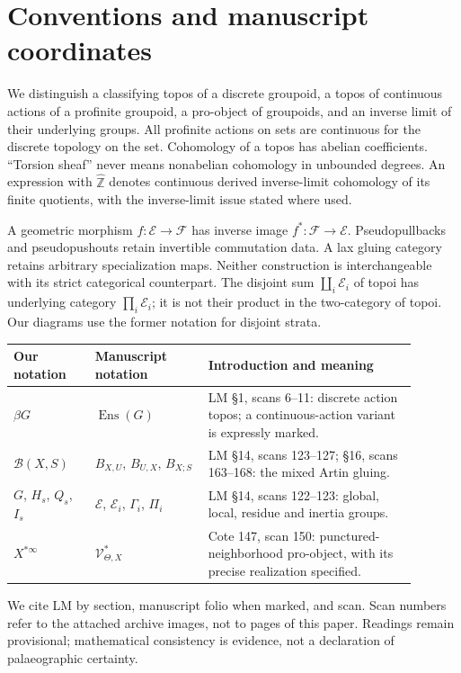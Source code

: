 \section*{Conventions and manuscript coordinates}
We distinguish a classifying topos of a discrete groupoid, a topos of continuous actions of a profinite groupoid, a pro-object of groupoids, and an inverse limit of their underlying groups. All profinite actions on sets are continuous for the discrete topology on the set. Cohomology of a topos has abelian coefficients. ``Torsion sheaf'' never means nonabelian cohomology in unbounded degrees. An expression with $\widehat{\mathbb Z}$ denotes continuous derived inverse-limit cohomology of its finite quotients, with the inverse-limit issue stated where used.

A geometric morphism $f:\mathcal E\to\mathcal F$ has inverse image $f^*:\mathcal F\to\mathcal E$. Pseudopullbacks and pseudopushouts retain invertible commutation data. A lax gluing category retains arbitrary specialization maps. Neither construction is interchangeable with its strict categorical counterpart.
The disjoint sum $\coprod_i\mathcal E_i$ of topoi has underlying category $\prod_i\mathcal E_i$; it is not their product in the two-category of topoi. Our diagrams use the former notation for disjoint strata.

\begin{longtable}{p{0.18\linewidth}p{0.25\linewidth}p{0.46\linewidth}}
\toprule
Our notation & Manuscript notation & Introduction and meaning\\
\midrule
$\beta G$ & $\operatorname{Ens}(G)$ & LM \S1, scans 6--11: discrete action topos; a continuous-action variant is expressly marked.\\
$\mathcal B(X,S)$ & $B_{X,U}$, $B_{U,X}$, $B_{X;S}$ & LM \S14, scans 123--127; \S16, scans 163--168: the mixed Artin gluing.\\
$G$, $H_s$, $Q_s$, $I_s$ & $\mathcal E$, $\mathcal E_i$, $\Gamma_i$, $\Pi_i$ & LM \S14, scans 122--123: global, local, residue and inertia groups.\\
$X^{*\infty}$ & $\mathcal V^*_{\Theta,X}$ & Cote 147, scan 150: punctured-neighborhood pro-object, with its precise realization specified.\\
\bottomrule
\end{longtable}
We cite LM by section, manuscript folio when marked, and scan. Scan numbers refer to the attached archive images, not to pages of this paper. Readings remain provisional; mathematical consistency is evidence, not a declaration of palaeographic certainty.
